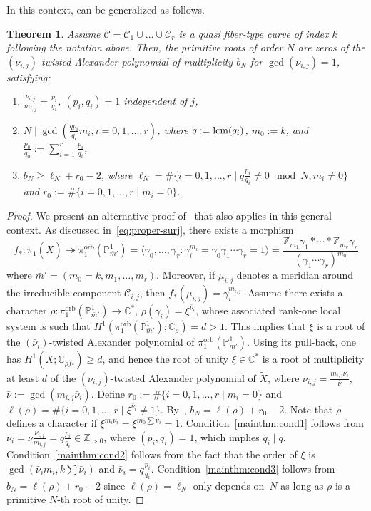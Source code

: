 \documentclass[11pt]{amsart}
\DeclareMathOperator{\orb}{orb}
\def\cC{\mathcal{C}}
\def\ZZ{\mathbb{Z}}
\def\CC{\mathbb{C}}
\def\PP{\mathbb{P}}
\def\surj{\mathbin{\twoheadrightarrow}}
\theoremstyle{plain}
\newtheorem{thm}{Theorem}
\theoremstyle{definition}
\begin{document}
In this context, \cite[Theorems 3.2 - 3.4]{DPS} can be generalized as follows. 
\begin{thm}
\label{thm:roots}
Assume $\cC=\cC_1\cup\ldots\cup\cC_r$ is a quasi fiber-type curve of index $k$ following the notation above. Then, the primitive roots of order $N$ are zeros of the $(\nu_{i,j})$-twisted Alexander polynomial of multiplicity $b_N$ for $\gcd(\nu_{i,j})=1$, satisfying:
\begin{enumerate}
\item\label{mainthm:cond1}
$\frac{\nu_{i,j}}{m_{i,j}}=\frac{p_i}{q_i}$, $(p_i,q_i)=1$ independent of $j$, 
\item\label{mainthm:cond2}
$N\mid\gcd\left(
\frac{q p_i}{q_i}m_i, i=0,1,...,r\right)$, where $q:={\rm lcm}(q_i)$, $m_0:=k$, and 
$\frac{p_0}{q_0}:=\sum_{i=1}^r\frac{p_i}{q_i}$,
\item\label{mainthm:cond3} 
$b_N\geq\ell_N+r_0-2$, where 
$\ell_N=\#\{i=0,1,...,r\mid q\frac{p_i}{q_i}\neq 0 \mod N, m_i\neq 0\}$ and $r_0:=\#\{i=0,1,...,r\mid m_i=0\}$. 
\end{enumerate}
\end{thm}
\begin{proof}
We present an alternative proof of~\cite[Theorems 3.2 -- 3.4]{DPS} that also applies in this general context.
As discussed in~\eqref{eq:proper-surj}, there exists a morphism 
\begin{equation}
\label{eq:proper-surj2}
f_*:\pi_1(\tilde X)\surj \pi^{\orb}_1(\PP^1_{\bar{m}'})=
\langle \gamma_0,\dots,\gamma_r: \gamma_i^{m_i}= \gamma_0\gamma_1\cdots\gamma_r=1\rangle=
\frac{\ZZ_{m_1}\gamma_1* \cdots*\ZZ_{m_r}\gamma_r}{(\gamma_1\cdots\gamma_r)^{m_0}}
\end{equation}
where $\bar m'=(m_0=k,m_1,\ldots,m_r)$. 
Moreover, if $\mu_{i,j}$ denotes a meridian around the irreducible component $\cC_{i,j}$, then $f_*(\mu_{i,j})=\gamma_{i}^{m_{i,j}}$. Assume there exists a character $\rho:\pi^{\orb}_1(\PP^1_{\bar{m}'})\to\CC^*$, $\rho(\gamma_i)=\xi^{\bar\nu_i}$, whose associated rank-one local system is such that $H^1(\pi^{\orb}_1(\PP^1_{\bar{m}'});\CC_\rho)=d>1$. This implies that $\xi$ is a root of the $(\bar\nu_i)$-twisted Alexander polynomial of $\pi^{\orb}_1(\PP^1_{\bar{m}'})$. Using its pull-back, one has $H^1(\tilde X;\CC_{\rho f_*})\geq d$, and hence the root of unity $\xi\in\CC^*$ is a root of multiplicity at least $d$ of the $(\nu_{i,j})$-twisted Alexander polynomial of $\tilde X$, where $\nu_{i,j}=\frac{m_{i,j}\bar\nu_i}{\bar\nu}$,  $\bar\nu:=\gcd(m_{i,j}\bar\nu_i)$. Define $r_0:=\#\{i=0,1, \ldots ,r\mid m_i=0\}$ and $\ell(\rho)=\#\{i=0,1, \ldots ,r\mid \xi^{\bar\nu_i}\neq 1\}$. By~\cite{BCM}, $b_N=\ell(\rho)+r_0-2$. Note that $\rho$ defines a character if $\xi^{m_i\bar\nu_i}=\xi^{m_0\sum \bar\nu_i}=1$. Condition~\eqref{mainthm:cond1} follows from $\bar\nu_{i}=\bar\nu\frac{\nu_{i,j}}{m_{i,j}}=q\frac{p_i}{q_i}\in\ZZ_{>0}$, where $(p_i,q_i)=1$, which implies $q_i\mid q$. Condition~\eqref{mainthm:cond2} follows from the fact that the order of $\xi$ is $\gcd(\bar\nu_im_i,k\sum\bar\nu_i)$ and $\bar\nu_{i}=q\frac{p_i}{q_i}$. 
Condition~\eqref{mainthm:cond3} follows from $b_N=\ell(\rho)+r_0-2$ since $\ell(\rho)=\ell_N$ only depends on~$N$ as long as $\rho$ is a primitive $N$-th root of unity. 
\end{proof}
\end{document}

